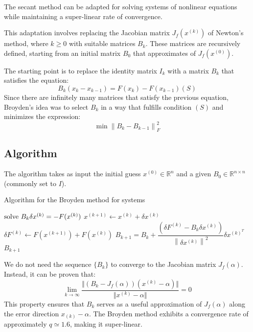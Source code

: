The secant method can be adapted for solving systems of nonlinear equations while maintaining a super-linear rate of convergence. 


This adaptation involves replacing the Jacobian matrix $J_f(x^{(k)})$ of Newton's method, where $k \geq 0$ with suitable matrices $B_k$. 
These matrices are recursively defined, starting from an initial matrix $B_0$ that approximates of $J_f(x^{(0)})$.

The starting point is to replace the identity matrix $I_k$ with a matrix $B_k$ that satisfies the equation: 
\[B_k\left(x_k-x_{k-1}\right)=F(x_k)-F(x_{k-1})(S)\]
Since there are infinitely many matrices that satisfy the previous equation, Broyden's idea was to select $B_k$ in a way that fulfills condition $(S)$ and minimizes the expression:
\[\min{\left\lVert B_k-B_{k-1} \right\rVert_F^2}\]

\subsection*{Algorithm}
The algorithm takes as input the initial guess $x^{(0)} \in \mathbb{R}^n$ and a given $B_0 \in \mathbb{R}^{n \times n}$ (commonly set to $I$). 
\begin{algorithm}[H]
    \caption{Algorithm for the Broyden method for systems}
        \begin{algorithmic}[1]
                \State $\textnormal{solve  } B_k\delta x^{(k)}=-F(x^{(k)})$
                \State $x^{(k+1)} \leftarrow x^{(k)}+\delta x^{(k)}$
                \State $\delta F^{(k)} \leftarrow F(x^{(k+1)})+F(x^{(k)})$
                \State $B_{k+1}=B_k+\dfrac{\left(\delta F^{(k)}-B_k\delta x^{(k)}\right)}{{\left\lVert \delta x^{(k)} \right\rVert}^{2}}\delta x^{(k)^T}$
                    \State \Return $B_{k+1}$
                \EndIf
            \EndFor
        \end{algorithmic}
\end{algorithm}

We do not need the sequence  $\{B_k\}$ to converge to the Jacobian matrix $J_f(\alpha)$. 
Instead, it can be proven that:
\[\lim_{k\rightarrow\infty}\dfrac{\Vert\left(B_k-J_f(\alpha)\right)\left(x^{(k)}-\alpha\right)\Vert}{\Vert x^{(k)}-\alpha\Vert}=0\]
This property ensures that $B_k$ serves as a useful approximation of $J_f(\alpha)$ along the error direction $x_{(k)}-\alpha$. 
The Broyden method exhibits a convergence rate of approximately $q \simeq 1.6$, making it super-linear.

